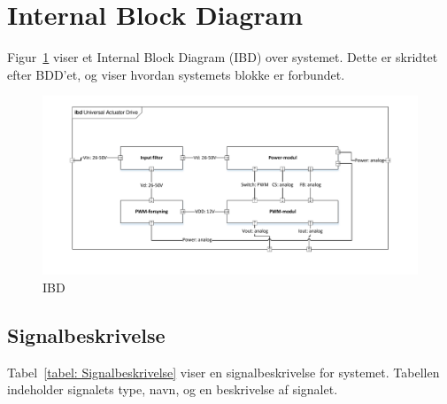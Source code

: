 \section{Internal Block Diagram}
\noindent Figur~\ref{fig: IBD} viser et Internal Block Diagram (IBD) over systemet. Dette er skridtet efter BDD'et, og viser hvordan systemets blokke er forbundet.


\begin{figure}[H]
	\centering
	\includegraphics[width=1.00\textwidth]{tex/systemarkitektur/billeder/IBD.pdf}
	\caption{IBD}
	\label{fig: IBD}
\end{figure}


\subsection{Signalbeskrivelse}
\noindent Tabel~\ref*{tabel: Signalbeskrivelse} viser en signalbeskrivelse for systemet. Tabellen indeholder signalets type, navn, og en beskrivelse af signalet.

